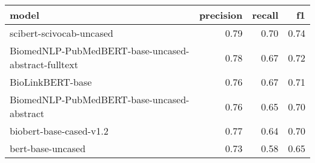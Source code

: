 \begin{tabular}{lrrr}
\toprule
model & precision & recall & f1 \\
\midrule
scibert-scivocab-uncased & 0.79 & 0.70 & 0.74 \\
BiomedNLP-PubMedBERT-base-uncased-abstract-fulltext & 0.78 & 0.67 & 0.72 \\
BioLinkBERT-base & 0.76 & 0.67 & 0.71 \\
BiomedNLP-PubMedBERT-base-uncased-abstract & 0.76 & 0.65 & 0.70 \\
biobert-base-cased-v1.2 & 0.77 & 0.64 & 0.70 \\
bert-base-uncased & 0.73 & 0.58 & 0.65 \\
\bottomrule
\end{tabular}
